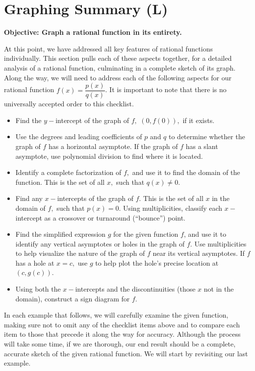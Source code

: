 \documentclass[12pt]{book}
\theoremstyle{definition}
\begin{document}
\section{Graphing Summary (L)}
{\bf Objective: Graph a rational function in its entirety.}\par
At this point, we have addressed all key features of rational functions individually.  This section pulls each of these aspects together, for a detailed analysis of a rational function, culminating in a complete sketch of its graph.  Along the way, we will need to address each of the following aspects for our rational function $f(x)=\dfrac{p(x)}{q(x)}$.  It is important to note that there is no universally accepted order to this checklist.
\begin{itemize}
	\item Find the $y-$intercept of the graph of $f,$ $(0,f(0)),$ if it exists.
	\item Use the degrees and leading coefficients of $p$ and $q$ to determine whether the graph of $f$ has a horizontal asymptote.  If the graph of $f$ has a slant asymptote, use polynomial division to find where it is located.
	\item Identify a complete factorization of $f,$ and use it to find the domain of the function.  This is the set of all $x,$ such that $q(x)\neq 0$.
	\item Find any $x-$intercepts of the graph of $f$.  This is the set of all $x$ in the domain of $f,$ such that $p(x)=0$.  Using multiplicities, classify each $x-$intercept as a crossover or turnaround (``bounce'') point.
	\item Find the simplified expression $g$ for the given function $f$, and use it to identify any vertical asymptotes or holes in the graph of $f$.  Use multiplicities to help visualize the nature of the graph of $f$ near its vertical asymptotes.  If $f$ has a hole at $x=c,$ use $g$ to help plot the hole's precise location at $(c,g(c))$. 
	\item Using both the $x-$intercepts and the discontinuities (those $x$ not in the domain), construct a sign diagram for $f$.
\end{itemize}
In each example that follows, we will carefully examine the given function, making sure not to omit any of the checklist items above and to compare each item to those that precede it along the way for accuracy.  Although the process will take some time, if we are thorough, our end result should be a complete, accurate sketch of the given rational function.  We will start by revisiting our last example.
\end{document}
